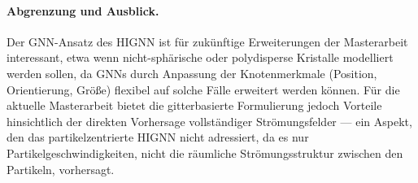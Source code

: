 \documentclass[a4paper,12pt]{article}
\begin{document}
\paragraph{Abgrenzung und Ausblick.}
Der GNN-Ansatz des HIGNN ist für zukünftige Erweiterungen der Masterarbeit interessant, etwa wenn nicht-sphärische oder polydisperse Kristalle modelliert werden sollen, da GNNs durch Anpassung der Knotenmerkmale (Position, Orientierung, Größe) flexibel auf solche Fälle erweitert werden können. Für die aktuelle Masterarbeit bietet die gitterbasierte Formulierung jedoch Vorteile hinsichtlich der direkten Vorhersage vollständiger Strömungsfelder — ein Aspekt, den das partikelzentrierte HIGNN nicht adressiert, da es nur Partikelgeschwindigkeiten, nicht die räumliche Strömungsstruktur zwischen den Partikeln, vorhersagt.
\end{document}
